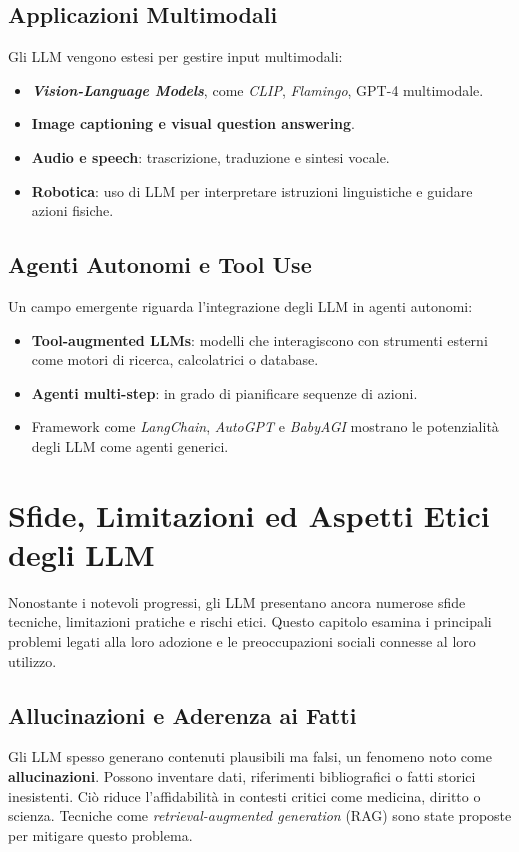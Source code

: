 \subsection{Applicazioni Multimodali}
Gli LLM vengono estesi per gestire input multimodali:
\begin{itemize}
    \item \textbf{\textit{Vision-Language Models}}, come \textit{CLIP}, \textit{Flamingo}, GPT-4 multimodale.
    \item \textbf{Image captioning e visual question answering}.
    \item \textbf{Audio e speech}: trascrizione, traduzione e sintesi vocale.
    \item \textbf{Robotica}: uso di LLM per interpretare istruzioni linguistiche e guidare azioni fisiche.
\end{itemize}

\subsection{Agenti Autonomi e Tool Use}
Un campo emergente riguarda l'integrazione degli LLM in agenti autonomi:
\begin{itemize}
    \item \textbf{Tool-augmented LLMs}: modelli che interagiscono con strumenti esterni 
    come motori di ricerca, calcolatrici o database.
    \item \textbf{Agenti multi-step}: in grado di pianificare sequenze di azioni.
    \item Framework come \textit{LangChain}, \textit{AutoGPT} e \textit{BabyAGI} mostrano 
    le potenzialità degli LLM come agenti generici.
\end{itemize}

\newpage
\section{Sfide, Limitazioni ed Aspetti Etici degli LLM}

Nonostante i notevoli progressi, gli LLM presentano ancora 
numerose sfide tecniche, limitazioni pratiche e rischi etici. 
Questo capitolo esamina i principali problemi legati alla loro adozione 
e le preoccupazioni sociali connesse al loro utilizzo.

\subsection{Allucinazioni e Aderenza ai Fatti}
Gli LLM spesso generano contenuti plausibili ma falsi, un fenomeno noto come \textbf{allucinazioni}.
Possono inventare dati, riferimenti bibliografici o fatti storici inesistenti. Ciò riduce l'affidabilità in contesti critici 
come medicina, diritto o scienza. Tecniche come \textit{\textit{retrieval-augmented generation}} (RAG) sono state proposte per mitigare questo problema.

